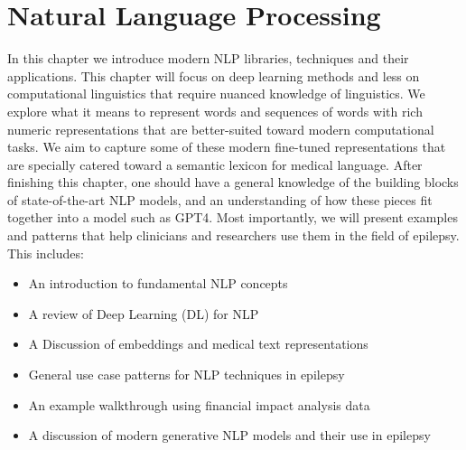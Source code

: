 
\chapter{Natural Language Processing}

In this chapter we introduce modern NLP libraries, techniques and their applications.
This chapter will focus on deep learning methods and less on computational linguistics that require nuanced knowledge of linguistics.
We explore what it means to represent words and sequences of words with rich numeric representations that are better-suited toward modern computational tasks.
We aim to capture some of these modern fine-tuned representations that are specially catered toward a semantic lexicon for medical language.
After finishing this chapter, one should have a general knowledge of the building blocks of state-of-the-art NLP models, and an understanding of how these
pieces fit together into a model such as GPT4\cite{openai2023gpt4}. Most importantly, we will present examples and patterns that help clinicians and researchers
use them in the field of epilepsy.
\\ 
\noindent This includes:
\begin{itemize}
\item An introduction to fundamental NLP concepts
\item A review of Deep Learning (DL) for NLP
\item A Discussion of embeddings and medical text representations
\item General use case patterns for NLP techniques in epilepsy
\item An example walkthrough using financial impact analysis data
\item A discussion of modern generative NLP models and their use in epilepsy
\end{itemize}







